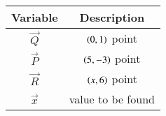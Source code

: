 \begin{tabular}[12pt]{ |c| c|}
    \hline
    \textbf{Variable} & \textbf{Description}\\ 
    \hline
	$\vec{Q}$ & $\left(0,1\right)$ point\\
    \hline
	$\vec{P}$ & $\left(5,-3\right)$ point\\
    \hline
	$\vec{R}$ & $\left(x,6\right)$ point\\
	\hline
	$\vec{x}$ & value to be found\\
   \hline
    \end{tabular}
